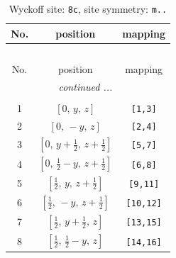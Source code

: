 \documentclass[fleqn,8pt]{jsarticle}
\begin{document}
\begin{longtable}{ccc}
\caption{Wyckoff site: {\tt 8c}, site symmetry: {\tt m..}}
 \\
 \hline \hline
No. & position & mapping \\ \hline \endfirsthead

\multicolumn{2}{l}{\tablename\ \thetable{}} \\
 \hline \hline
No. & position & mapping \\ \hline \endhead

 \hline \hline
\multicolumn{2}{r}{\footnotesize\it continued ...} \\ \endfoot

 \hline \hline
\multicolumn{2}{r}{} \\ \endlastfoot

1 & $\left[ 0,\, y,\, z \right]$ & {\tt [1,3]} \\ \hline
2 & $\left[ 0,\, - y,\, z \right]$ & {\tt [2,4]} \\ \hline
3 & $\left[ 0,\, y + \frac{1}{2},\, z + \frac{1}{2} \right]$ & {\tt [5,7]} \\ \hline
4 & $\left[ 0,\, \frac{1}{2} - y,\, z + \frac{1}{2} \right]$ & {\tt [6,8]} \\ \hline
5 & $\left[ \frac{1}{2},\, y,\, z + \frac{1}{2} \right]$ & {\tt [9,11]} \\ \hline
6 & $\left[ \frac{1}{2},\, - y,\, z + \frac{1}{2} \right]$ & {\tt [10,12]} \\ \hline
7 & $\left[ \frac{1}{2},\, y + \frac{1}{2},\, z \right]$ & {\tt [13,15]} \\ \hline
8 & $\left[ \frac{1}{2},\, \frac{1}{2} - y,\, z \right]$ & {\tt [14,16]} \\
\end{longtable}
\renewcommand{\arraystretch}{1.2}
\end{document}
